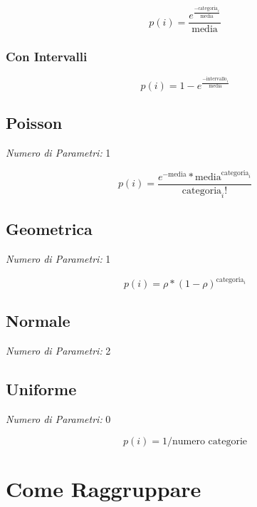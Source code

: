 \[
      p(i) = \frac{e^{\frac{- \text{categoria}_i}{\text{media}}}}{\text{media}}
\]

\subsubsection{Con Intervalli}

\[
      p(i) = 1 - e^{\frac{- \text{intervallo}_i}{\text{media}}}
\]

\subsection{Poisson}

\textit{Numero di Parametri:} 1

\[
      p(i) = \frac{e^{- \text{media}} * \text{media}^{\text{categoria}_i}}{\text{categoria}_i !}
\]

\subsection{Geometrica}

\textit{Numero di Parametri:} 1

\[
      p(i) = \rho * (1 - \rho)^{\text{categoria}_i}
\]

\subsection{Normale}

\textit{Numero di Parametri:} 2

\subsection{Uniforme}

\textit{Numero di Parametri:} 0

\[
      p(i) = 1 / \text{numero categorie}
\]

\section{Come Raggruppare} \label{raggruppare}


